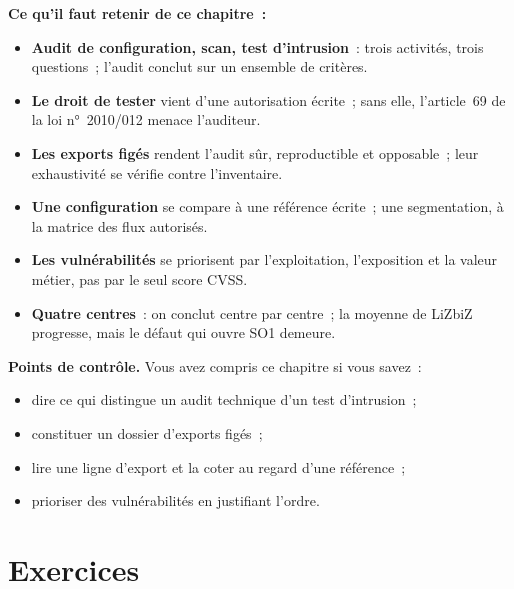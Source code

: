 \begin{boxresume}
\textbf{Ce qu'il faut retenir de ce chapitre~:}
\begin{itemize}
    \item \textbf{Audit de configuration, scan, test d'intrusion}~: trois
          activités, trois questions~; l'audit conclut sur un ensemble de
          critères.
    \item \textbf{Le droit de tester} vient d'une autorisation écrite~; sans
          elle, l'article~69 de la loi n°~2010/012 menace l'auditeur.
    \item \textbf{Les exports figés} rendent l'audit sûr, reproductible et
          opposable~; leur exhaustivité se vérifie contre l'inventaire.
    \item \textbf{Une configuration} se compare à une référence écrite~; une
          segmentation, à la matrice des flux autorisés.
    \item \textbf{Les vulnérabilités} se priorisent par l'exploitation,
          l'exposition et la valeur métier, pas par le seul score CVSS.
    \item \textbf{Quatre centres}~: on conclut centre par centre~; la
          moyenne de LiZbiZ progresse, mais le défaut qui ouvre SO1 demeure.
\end{itemize}
\end{boxresume}

\begin{boxinfo}
\textbf{Points de contrôle.} Vous avez compris ce chapitre si vous savez~:
\begin{itemize}
    \item dire ce qui distingue un audit technique d'un test d'intrusion~;
    \item constituer un dossier d'exports figés~;
    \item lire une ligne d'export et la coter au regard d'une référence~;
    \item prioriser des vulnérabilités en justifiant l'ordre.
\end{itemize}
\end{boxinfo}

\section*{Exercices}

